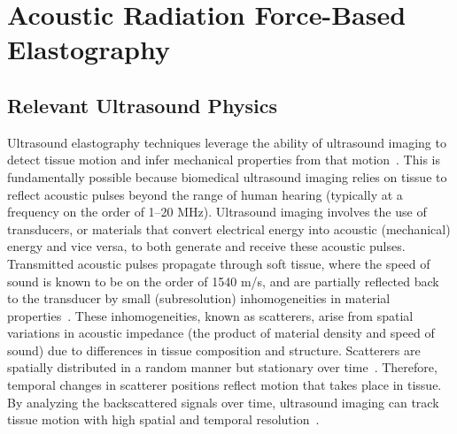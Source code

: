 
\section{Acoustic Radiation Force-Based Elastography}

\subsection{Relevant Ultrasound Physics}


Ultrasound elastography techniques leverage the ability of ultrasound imaging to detect tissue motion and infer mechanical properties from that motion~\cite{nenadic_Ultrasound_2019}. This is fundamentally possible because biomedical ultrasound imaging relies on tissue to reflect acoustic pulses beyond the range of human hearing (typically at a frequency on the order of 1--20 MHz). Ultrasound imaging involves the use of transducers, or materials that convert electrical energy into acoustic (mechanical) energy and vice versa, to both generate and receive these acoustic pulses. Transmitted acoustic pulses propagate through soft tissue, where the speed of sound is known to be on the order of 1540 m/s, and are partially reflected back to the transducer by small (subresolution) inhomogeneities in material properties~\cite{trahey_Properties_1988}. These inhomogeneities, known as scatterers, arise from spatial variations in acoustic impedance (the product of material density and speed of sound) due to differences in tissue composition and structure. Scatterers are spatially distributed in a random manner but stationary over time~\cite{trahey_Properties_1988}. Therefore, temporal changes in scatterer positions reflect motion that takes place in tissue. By analyzing the backscattered signals over time, ultrasound imaging can track tissue motion with high spatial and temporal resolution~\cite{kasai_RealTime_1985,loupas_Experimental_1995,ashikuzzaman_Displacement_2024}.


